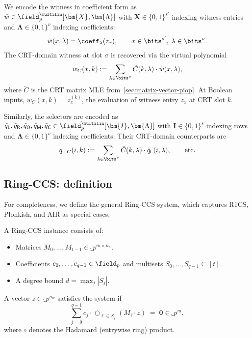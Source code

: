 We encode the witness in coefficient form as $\tilde{w} \in \field_p^{\multilin}[\bm{X}, \bm{\Lambda}]$ with $\bm{X} \in \{0,1\}^{s'}$ indexing witness entries and $\bm{\Lambda} \in \{0,1\}^\nu$ indexing coefficients:
\[
    \tilde{w}(x, \lambda) = \coeff_\lambda(z_x), \qquad x \in \bits^{s'},\; \lambda \in \bits^\nu.
\]
The CRT-domain witness at slot $\sigma$ is recovered via the virtual polynomial
\[
    w_C(x, k) := \sum_{\lambda \in \bits^\nu} \tilde{C}(k, \lambda) \cdot \tilde{w}(x, \lambda),
\]
where $\tilde{C}$ is the CRT matrix MLE from~\cref{sec:matrix-vector-piop}.
At Boolean inputs, $w_C(x, k) = z_x^{(k)}$, the evaluation of witness entry $z_x$ at CRT slot $k$.

Similarly, the selectors are encoded as $\tilde{q}_\mathsf{L}, \tilde{q}_\mathsf{R}, \tilde{q}_\mathsf{O}, \tilde{q}_\mathsf{M}, \tilde{q}_\mathsf{C} \in \field_p^{\multilin}[\bm{I}, \bm{\Lambda}]$ with $\bm{I} \in \{0,1\}^s$ indexing rows and $\bm{\Lambda} \in \{0,1\}^\nu$ indexing coefficients.
Their CRT-domain counterparts are
\[
    q_{\mathsf{L},C}(i, k) := \sum_{\lambda \in \bits^\nu} \tilde{C}(k, \lambda) \cdot \tilde{q}_\mathsf{L}(i, \lambda), \qquad \text{etc.}
\]


\subsection{Ring-CCS: definition}
\label{sec:ring-ccs-def}

For completeness, we define the general Ring-CCS system, which captures R1CS, Plonkish, and AIR as special cases.

\begin{definition}
\label{def:ring-ccs}
A Ring-CCS instance consists of:
\begin{itemize}
    \item Matrices $M_0, \ldots, M_{t-1} \in \ring_p^{m \times n_w}$.
    \item Coefficients $c_0, \ldots, c_{q-1} \in \field_p$ and multisets $S_0, \ldots, S_{q-1} \subseteq [t]$.
    \item A degree bound $d = \max_j |S_j|$.
\end{itemize}
A vector $z \in \ring_p^{n_w}$ satisfies the system if
\begin{equation}\label{eq:ring-ccs}
    \sum_{j=0}^{q-1} c_j \cdot \bigcirc_{\ell \in S_j} (M_\ell \cdot z) \;=\; \mathbf{0} \in \ring_p^m,
\end{equation}
where $\circ$ denotes the Hadamard (entrywise ring) product.
\end{definition}

